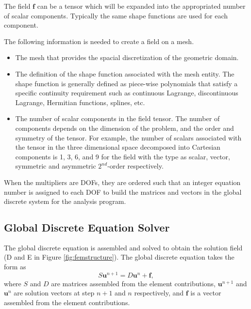 \documentclass[11pt]{article}  %
\begin{document}
The field $\mathbf{f}$ can be a tensor which will be expanded into the appropriated number of scalar components. Typically the same shape functions are used for each component. 

The following information is needed to create a field on a mesh.
\begin{itemize}
\item The mesh that provides the spacial discretization of the geometric domain. 
\item The definition of the shape function associated with the mesh entity.  The shape function is generally defined  as piece-wise polynomials that satisfy a specific continuity requirement such as continuous Lagrange, discontinuous Lagrange, Hermitian functions, splines, etc.
\item The number of scalar components in the field tensor. The number of components depends on the dimension of the problem, and the order and symmetry of the tensor. For example, the number of scalars associated with the tensor in the three dimensional space decomposed into Cartesian components is  1, 3, 6, and 9  for the field with the type as scalar, vector, symmetric and asymmetric $2^{nd}$-order respectively. 
\end{itemize}

When the multipliers are DOFs, they are ordered such that an integer equation number is assigned to each DOF to build the matrices and vectors in the global discrete system for the analysis program. 

\subsection{Global Discrete Equation Solver}

The global discrete equation is assembled and solved to obtain the solution field (D and E in Figure \ref{fig:femstructure}). The global discrete equation takes the form as
\begin{equation}
S \mathbf{u}^{n+1} = D \mathbf{u}^n +\mathbf{f}, \label{eqn:sys}
\end{equation}
where $S$ and $D$ are matrices assembled from the element contributions, $\mathbf{u}^{n+1}$ and $\mathbf{u}^{n}$ are solution vectors at step $n+1$ and $n$ respectively, and $\mathbf{f}$ is a vector assembled from the element contributions. 


\end{document}
